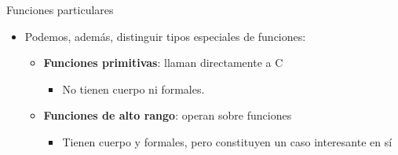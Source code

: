 \documentclass[
  ignorenonframetext,
]{beamer}
\providecommand{\tightlist}{%
  \setlength{\itemsep}{0pt}\setlength{\parskip}{0pt}}
\begin{document}
\begin{frame}{Funciones particulares}
\protect\hypertarget{funciones-particulares}{}
\begin{itemize}
\tightlist
\item
  Podemos, además, distinguir tipos especiales de funciones:

  \begin{itemize}
  \tightlist
  \item
    \textbf{Funciones primitivas}: llaman directamente a C

    \begin{itemize}
    \tightlist
    \item
      No tienen cuerpo ni formales.
    \end{itemize}
  \item
    \textbf{Funciones de alto rango}: operan sobre funciones

    \begin{itemize}
    \tightlist
    \item
      Tienen cuerpo y formales, pero constituyen un caso interesante en
      sí
    \end{itemize}
  \end{itemize}
\end{itemize}
\end{frame}
\end{document}
